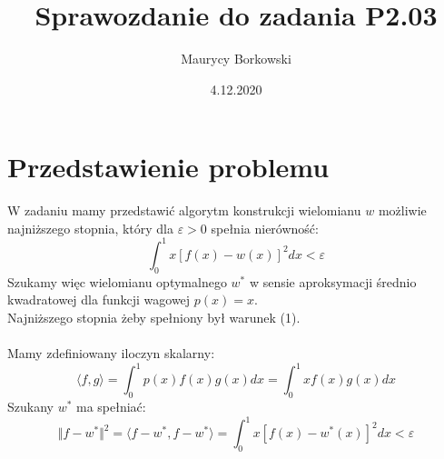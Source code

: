 \documentclass{article}
\title{Sprawozdanie do zadania \textbf{P2.03}}
\date{4.12.2020}
\author{Maurycy Borkowski}
\begin{document}
\maketitle
\section{Przedstawienie problemu}
W zadaniu mamy przedstawić algorytm konstrukcji wielomianu $w$ możliwie najniższego stopnia, który dla $\varepsilon > 0$ spełnia nierówność:
\begin{equation}
\int_0^1 x[f(x) - w(x)]^2 dx < \varepsilon
\end{equation}
Szukamy więc wielomianu optymalnego $w^*$ w sensie aproksymacji średnio kwadratowej dla funkcji wagowej $p(x) = x$.\\Najniższego stopnia żeby spełniony był warunek (1).\\\\
Mamy zdefiniowany iloczyn skalarny:
\begin{equation}
\langle f,g\rangle = \int_0^1 p(x)f(x)g(x) dx = \int_0^1 xf(x)g(x) dx
\end{equation}
Szukany $w^*$ ma spełniać:
\begin{equation}
\Vert f - w^*\Vert^2 = \langle f-w^*,f-w^*\rangle = \int_0^1 x[f(x) - w^*(x)]^2 dx < \varepsilon
\end{equation}
\end{document}
